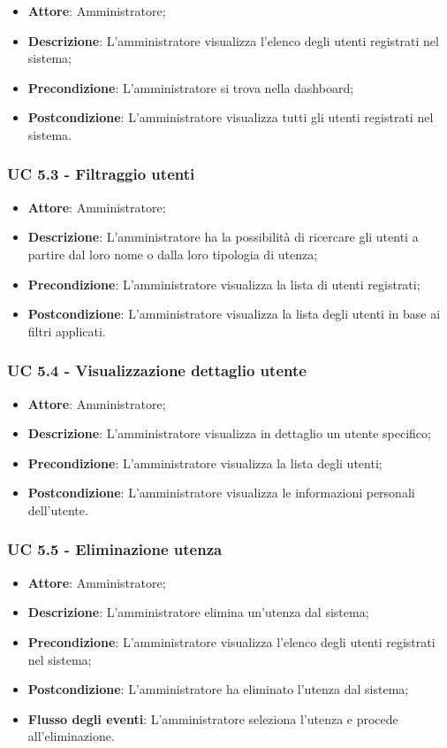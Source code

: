 \begin{itemize}
\item \textbf{Attore}: Amministratore;
\item \textbf{Descrizione}: L'amministratore visualizza l'elenco degli utenti registrati nel sistema;
\item \textbf{Precondizione}: L'amministratore si trova nella dashboard;
\item \textbf{Postcondizione}: L'amministratore visualizza tutti gli utenti registrati nel sistema.
\end{itemize}

\subsubsection{UC 5.3 - Filtraggio utenti}
\begin{itemize}
\item \textbf{Attore}: Amministratore;
\item \textbf{Descrizione}: L'amministratore ha la possibilità di ricercare gli utenti a partire dal loro nome o dalla loro tipologia di utenza;
\item \textbf{Precondizione}: L'amministratore visualizza la lista di utenti registrati;
\item \textbf{Postcondizione}: L'amministratore visualizza la lista degli utenti in base ai filtri applicati.
\end{itemize}

\subsubsection{UC 5.4 - Visualizzazione dettaglio utente}
\begin{itemize}
\item \textbf{Attore}: Amministratore;
\item \textbf{Descrizione}: L'amministratore visualizza in dettaglio un utente specifico;
\item \textbf{Precondizione}: L'amministratore visualizza la lista degli utenti;
\item \textbf{Postcondizione}: L'amministratore visualizza le informazioni personali dell'utente.
\end{itemize}


\subsubsection{UC 5.5 - Eliminazione utenza}
\begin{itemize}
\item \textbf{Attore}: Amministratore;
\item \textbf{Descrizione}: L'amministratore elimina un'utenza dal sistema;
\item \textbf{Precondizione}: L'amministratore visualizza l'elenco degli utenti registrati nel sistema;
\item \textbf{Postcondizione}: L'amministratore ha eliminato l'utenza dal sistema;
\item \textbf{Flusso degli eventi}: L'amministratore seleziona l'utenza e procede all'eliminazione.
\end{itemize}


